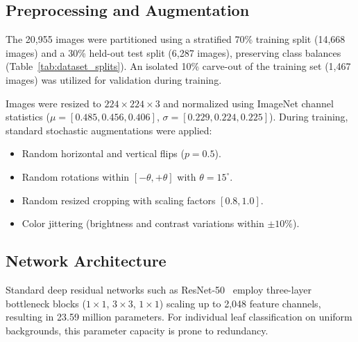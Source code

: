 \documentclass[conference]{IEEEtran}
\begin{document}
\begin{table}[htbp]
\caption{Dataset Partitioning Strategy Across Irrigation Classes}
\label{tab:dataset_splits}
\centering
{}
\end{table}

\subsection{Preprocessing and Augmentation}
The 20,955 images were partitioned using a stratified 70\% training split (14,668 images) and a 30\% held-out test split (6,287 images), preserving class balances (Table~\ref{tab:dataset_splits}). An isolated 10\% carve-out of the training set (1,467 images) was utilized for validation during training.

Images were resized to $224 \times 224 \times 3$ and normalized using ImageNet channel statistics ($\mu = [0.485, 0.456, 0.406]$, $\sigma = [0.229, 0.224, 0.225]$). During training, standard stochastic augmentations were applied:
\begin{itemize}
    \item Random horizontal and vertical flips ($p = 0.5$).
    \item Random rotations within $[-\theta, +\theta]$ with $\theta = 15^\circ$.
    \item Random resized cropping with scaling factors $[0.8, 1.0]$.
    \item Color jittering (brightness and contrast variations within $\pm 10\%$).
\end{itemize}

\subsection{Network Architecture}
Standard deep residual networks such as ResNet-50~\cite{he2016deep} employ three-layer bottleneck blocks ($1\times1$, $3\times3$, $1\times1$) scaling up to 2,048 feature channels, resulting in 23.59 million parameters. For individual leaf classification on uniform backgrounds, this parameter capacity is prone to redundancy.
\end{document}
